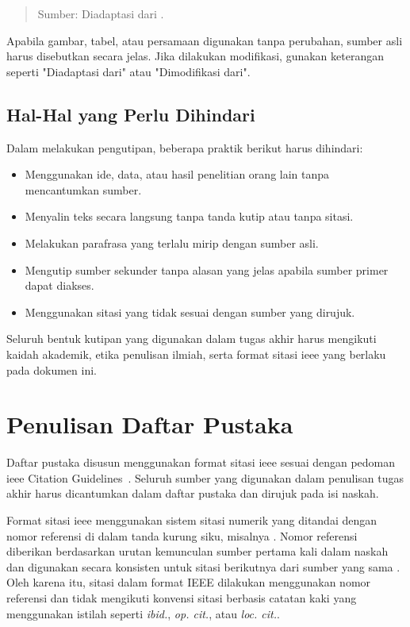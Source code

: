 \begin{quote}
    Sumber: Diadaptasi dari \cite{contohReferensi}.
\end{quote}

Apabila gambar, tabel, atau persamaan digunakan tanpa perubahan, sumber asli harus disebutkan secara jelas. Jika dilakukan modifikasi, gunakan keterangan seperti "Diadaptasi dari" atau "Dimodifikasi dari".

\subsection{Hal-Hal yang Perlu Dihindari}

Dalam melakukan pengutipan, beberapa praktik berikut harus dihindari:

\begin{itemize}[topsep=0pt,itemsep=0pt,parsep=0pt,leftmargin=*]
\item Menggunakan ide, data, atau hasil penelitian orang lain tanpa mencantumkan sumber.
\item Menyalin teks secara langsung tanpa tanda kutip atau tanpa sitasi.
\item Melakukan parafrasa yang terlalu mirip dengan sumber asli.
\item Mengutip sumber sekunder tanpa alasan yang jelas apabila sumber primer dapat diakses.
\item Menggunakan sitasi yang tidak sesuai dengan sumber yang dirujuk.
\end{itemize}

Seluruh bentuk kutipan yang digunakan dalam tugas akhir harus mengikuti kaidah akademik, etika penulisan ilmiah, serta format sitasi \gls{ieee} yang berlaku pada dokumen ini.

\section{Penulisan Daftar Pustaka}

Daftar pustaka disusun menggunakan format sitasi \gls{ieee} sesuai dengan pedoman \gls{ieee} Citation Guidelines~\cite{IEEEReferenceGuide2023}. Seluruh sumber yang digunakan dalam penulisan tugas akhir harus dicantumkan dalam daftar pustaka dan dirujuk pada isi naskah.

Format sitasi \gls{ieee} menggunakan sistem sitasi numerik yang ditandai dengan nomor referensi di dalam tanda kurung siku, misalnya \cite{Simonovic2021}. Nomor referensi diberikan berdasarkan urutan kemunculan sumber pertama kali dalam naskah dan digunakan secara konsisten untuk sitasi berikutnya dari sumber yang sama \cite{IEEEReferenceGuide2023,IEEEEditorialStyleManual}. Oleh karena itu, sitasi dalam format IEEE dilakukan menggunakan nomor referensi dan tidak mengikuti konvensi sitasi berbasis catatan kaki yang menggunakan istilah seperti \textit{ibid.}, \textit{op. cit.}, atau \textit{loc. cit.}.

